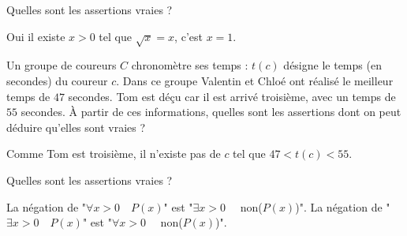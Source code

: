 \begin{question}
Quelles sont les assertions vraies ?
\begin{answers}  


 
\end{answers}
\begin{explanations}
Oui il existe $x>0$ tel que $\sqrt{x} = x$, c'est $x=1$.
\end{explanations}
\end{question}


\begin{question}
Un groupe de coureurs $C$ chronomètre ses temps : $t(c)$ désigne le temps (en secondes) du coureur $c$.
Dans ce groupe Valentin et Chloé ont réalisé le meilleur temps de $47$ secondes. Tom est déçu car il est arrivé troisième, avec un temps de $55$ secondes.
À partir de ces informations, quelles sont les assertions dont on peut déduire qu'elles sont vraies ?
\begin{answers}



\end{answers}
\begin{explanations}
Comme Tom est troisième, il n'existe pas de $c$ tel que $47 < t(c) < 55$. 
\end{explanations}
\end{question}


\begin{question}
Quelles sont les assertions vraies ?
\begin{answers}



\end{answers}
\begin{explanations}
La négation de "$\forall x > 0 \quad P(x)$" est "$\exists x > 0 \quad$ non($P(x)$)".
La négation de "$\exists x > 0 \quad P(x)$" est "$\forall x > 0 \quad$ non($P(x)$)".
\end{explanations}
\end{question}

